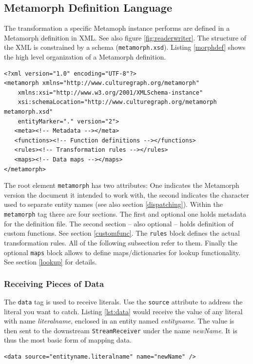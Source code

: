 \documentclass[12pt,a4paper]{article}
\begin{document}
\subsection{Metamorph Definition Language}\label{def_lang}
The transformation a specific Metamoph instance performs are defined in a Metamorph definition in XML. See also figure \ref{fig:readerwriter}. The structure of the XML is constrained by a schema ({\tt metamorph.xsd}). Listing \ref{morphdef} shows the high level organization of a Metamorph definition.

\begin{lstlisting}[float=htb, label=morphdef,caption=Structure of a Metamorph definition file.]
<?xml version="1.0" encoding="UTF-8"?>
<metamorph xmlns="http://www.culturegraph.org/metamorph"
	xmlns:xsi="http://www.w3.org/2001/XMLSchema-instance"
	xsi:schemaLocation="http://www.culturegraph.org/metamorph metamorph.xsd"
	entityMarker="." version="2">
   <meta><!-- Metadata --></meta>
   <functions><!-- Function definitions --></functions>
   <rules><!-- Transformation rules --></rules>
   <maps><!-- Data maps --></maps>
</metamorph>
\end{lstlisting}
The root element {\tt metamorph} has two attributes: One indicates the Metamorph version the document it intended to work with, the second indicates the character used to separate entity names (see also section \ref{dispatching}). Within the {\tt metamorph} tag there are four sections.
The first and optional one holds metadata for the definition file. The second section -- also optional -- holds definition of custom functions. See section \ref{customfunc}.
The {\tt rules} block defines the actual transformation rules. All of the following subsection refer to them.
Finally the optional {\tt maps} block allows to define maps/dictionaries for lookup functionality. See section \ref{lookup} for details.


\subsubsection{Receiving Pieces of Data}\label{data}

The {\tt data} tag is used to receive literals. Use the {\tt source} attribute to address the literal you want to catch. Listing \ref{lst:data} would receive the value of any literal with name {\it literalname}, enclosed in an entity named {\it entityname}.
The value is then sent to the downstream {\tt StreamReceiver} under the name {\it newName}. It is thus the most basic form of mapping data.
\begin{lstlisting}[float=htb, label=lst:data,caption=Receiving values from literals]
<data source="entityname.literalname" name="newName" />
\end{lstlisting}
\end{document}
